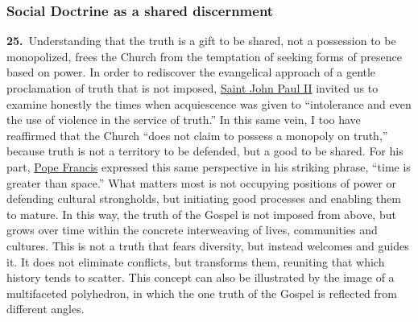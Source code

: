 \documentclass{article}
\begin{document}
\subsubsection{Social Doctrine as a shared discernment}

\textbf{25.}\ Understanding that the truth is a gift to be shared, not a possession to be monopolized, frees the Church from the temptation of seeking forms of presence based on power. In order to rediscover the evangelical approach of a gentle proclamation of truth that is not imposed, \href{https://www.vatican.va/content/john-paul-ii/en.html}{Saint John Paul II} invited us to examine honestly the times when acquiescence was given to ``intolerance and even the use of violence in the service of truth.''\cite{n16} In this same vein, I too have reaffirmed that the Church ``does not claim to possess a monopoly on truth,''\cite{n17} because truth is not a territory to be defended, but a good to be shared. For his part, \href{https://www.vatican.va/content/francesco/en.html}{Pope Francis} expressed this same perspective in his striking phrase, ``time is greater than space.''\cite{n18} What matters most is not occupying positions of power or defending cultural strongholds, but initiating good processes and enabling them to mature. In this way, the truth of the Gospel is not imposed from above, but grows over time within the concrete interweaving of lives, communities and cultures. This is not a truth that fears diversity, but instead welcomes and guides it. It does not eliminate conflicts, but transforms them, reuniting that which history tends to scatter. This concept can also be illustrated by the image of a multifaceted polyhedron,\cite{n19} in which the one truth of the Gospel is reflected from different angles.
\end{document}
